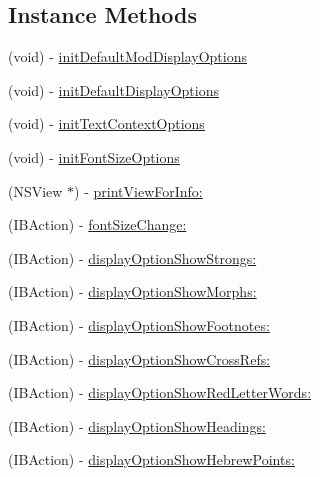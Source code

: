 \subsection*{Instance Methods}
\begin{DoxyCompactItemize}
\item 
(void) -\/ \hyperlink{interface_module_commons_view_controller_a46930b10057f898855c5f0b2d21f59d2}{init\-Default\-Mod\-Display\-Options}
\item 
(void) -\/ \hyperlink{interface_module_commons_view_controller_a6167501c8506672add5b8d13cb53c653}{init\-Default\-Display\-Options}
\item 
(void) -\/ \hyperlink{interface_module_commons_view_controller_a4a582e0f067a8782e348592ed046f9c3}{init\-Text\-Context\-Options}
\item 
(void) -\/ \hyperlink{interface_module_commons_view_controller_adaf8d0000fb6ca7c0ccb18af1389d0bd}{init\-Font\-Size\-Options}
\item 
(N\-S\-View $\ast$) -\/ \hyperlink{interface_module_commons_view_controller_a317ade3c8c49207aa6ae83f736469342}{print\-View\-For\-Info\-:}
\item 
(I\-B\-Action) -\/ \hyperlink{interface_module_commons_view_controller_af9bed424af23669bd90e4d8d4d879cd9}{font\-Size\-Change\-:}
\item 
(I\-B\-Action) -\/ \hyperlink{interface_module_commons_view_controller_ac04a31fd03c4c64d0de3070b4c6eedc3}{display\-Option\-Show\-Strongs\-:}
\item 
(I\-B\-Action) -\/ \hyperlink{interface_module_commons_view_controller_a5ca36c9e29ba676129e4d5321ee725c1}{display\-Option\-Show\-Morphs\-:}
\item 
(I\-B\-Action) -\/ \hyperlink{interface_module_commons_view_controller_a7727d17e5d94025bf6c65e1c4cb6881e}{display\-Option\-Show\-Footnotes\-:}
\item 
(I\-B\-Action) -\/ \hyperlink{interface_module_commons_view_controller_ad85b4b8a22256ffde64d824cc79e8972}{display\-Option\-Show\-Cross\-Refs\-:}
\item 
(I\-B\-Action) -\/ \hyperlink{interface_module_commons_view_controller_af7b03f9a62fb4585d418bd5d0cdbc749}{display\-Option\-Show\-Red\-Letter\-Words\-:}
\item 
(I\-B\-Action) -\/ \hyperlink{interface_module_commons_view_controller_a976983efb1a5976fbfc0cadcb4fafe0b}{display\-Option\-Show\-Headings\-:}
\item 
(I\-B\-Action) -\/ \hyperlink{interface_module_commons_view_controller_a46267c329182e406db28346c0032d158}{display\-Option\-Show\-Hebrew\-Points\-:}

\end{DoxyCompactItemize}
